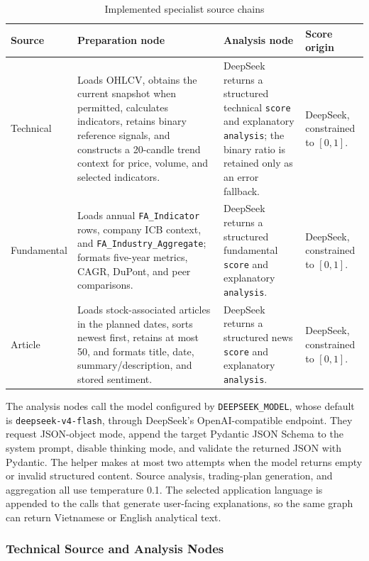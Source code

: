\begin{table}[H]
    \centering
    \caption{Implemented specialist source chains}
    \label{tab:specialist-node-responsibilities}
    \footnotesize
    \setlength{\tabcolsep}{4pt}
    \renewcommand{\arraystretch}{1.18}
    \begin{tabular}{p{2.2cm} p{4.3cm} p{4.4cm} p{2.5cm}}
        \toprule
        \textbf{Source} & \textbf{Preparation node} & \textbf{Analysis node} & \textbf{Score origin} \\
        \midrule
        Technical & Loads OHLCV, obtains the current snapshot when permitted, calculates indicators, retains binary reference signals, and constructs a 20-candle trend context for price, volume, and selected indicators. & DeepSeek returns a structured technical \texttt{score} and explanatory \texttt{analysis}; the binary ratio is retained only as an error fallback. & DeepSeek, constrained to $[0,1]$. \\
        Fundamental & Loads annual \texttt{FA\_Indicator} rows, company ICB context, and \texttt{FA\_Industry\_Aggregate}; formats five-year metrics, CAGR, DuPont, and peer comparisons. & DeepSeek returns a structured fundamental \texttt{score} and explanatory \texttt{analysis}. & DeepSeek, constrained to $[0,1]$. \\
        Article & Loads stock-associated articles in the planned dates, sorts newest first, retains at most 50, and formats title, date, summary/description, and stored sentiment. & DeepSeek returns a structured news \texttt{score} and explanatory \texttt{analysis}. & DeepSeek, constrained to $[0,1]$. \\
        \bottomrule
    \end{tabular}
\end{table}

The analysis nodes call the model configured by \texttt{DEEPSEEK\_MODEL}, whose default is \texttt{deepseek-v4-flash}, through DeepSeek's OpenAI-compatible endpoint. They request JSON-object mode, append the target Pydantic JSON Schema to the system prompt, disable thinking mode, and validate the returned JSON with Pydantic. The helper makes at most two attempts when the model returns empty or invalid structured content. Source analysis, trading-plan generation, and aggregation all use temperature 0.1. The selected application language is appended to the calls that generate user-facing explanations, so the same graph can return Vietnamese or English analytical text.

\subsubsection{Technical Source and Analysis Nodes}
\label{subsubsec:technical-analysis-node}

